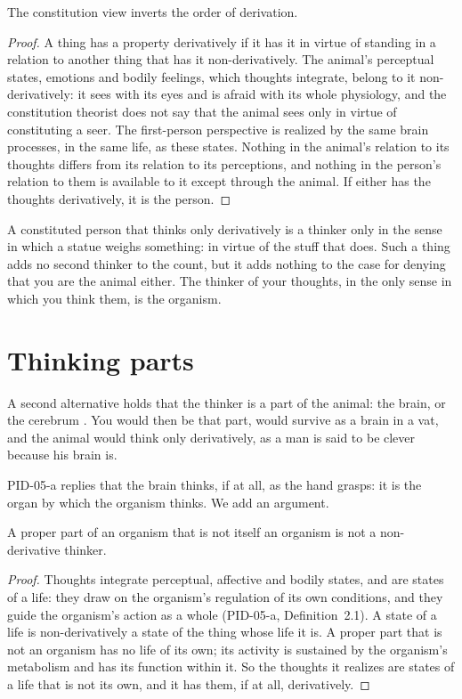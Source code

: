 \documentclass{situationist-preprint}
\begin{document}
\begin{proposition}\label{p:const}
The constitution view inverts the order of derivation.
\end{proposition}

\begin{proof}
A thing has a property derivatively if it has it in virtue of standing in a relation to another thing that has it non-derivatively. The animal's perceptual states, emotions and bodily feelings, which thoughts integrate, belong to it non-derivatively: it sees with its eyes and is afraid with its whole physiology, and the constitution theorist does not say that the animal sees only in virtue of constituting a seer. The first-person perspective is realized by the same brain processes, in the same life, as these states. Nothing in the animal's relation to its thoughts differs from its relation to its perceptions, and nothing in the person's relation to them is available to it except through the animal. If either has the thoughts derivatively, it is the person.
\end{proof}

A constituted person that thinks only derivatively is a thinker only in the sense in which a statue weighs something: in virtue of the stuff that does. Such a thing adds no second thinker to the count, but it adds nothing to the case for denying that you are the animal either. The thinker of your thoughts, in the only sense in which you think them, is the organism.

\section{Thinking parts}

A second alternative holds that the thinker is a part of the animal: the brain, or the cerebrum \citep{McMahan2002}. You would then be that part, would survive as a brain in a vat, and the animal would think only derivatively, as a man is said to be clever because his brain is.

PID-05-a replies that the brain thinks, if at all, as the hand grasps: it is the organ by which the organism thinks. We add an argument.

\begin{proposition}\label{p:parts}
A proper part of an organism that is not itself an organism is not a non-derivative thinker.
\end{proposition}

\begin{proof}
Thoughts integrate perceptual, affective and bodily states, and are states of a life: they draw on the organism's regulation of its own conditions, and they guide the organism's action as a whole (PID-05-a, Definition~2.1). A state of a life is non-derivatively a state of the thing whose life it is. A proper part that is not an organism has no life of its own; its activity is sustained by the organism's metabolism and has its function within it. So the thoughts it realizes are states of a life that is not its own, and it has them, if at all, derivatively.
\end{proof}
\end{document}
